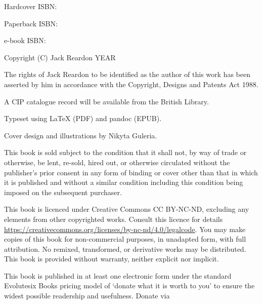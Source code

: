 Hardcover ISBN:

Paperback ISBN:

e-book ISBN:

Copyright (C) Jack Reardon YEAR

The rights of Jack Reardon to be identified as the author of this work
has been asserted by him in accordance with the Copyright, Designs and
Patents Act 1988.

A CIP catalogue record will be available from the British Library.

Typeset using LaTeX (PDF) and pandoc (EPUB).

Cover design and illustrations by Nikyta Guleria.

This book is sold subject to the condition that it shall not, by way of
trade or otherwise, be lent, re-sold, hired out, or otherwise circulated
without the publisher's prior consent in any form of binding or cover
other than that in which it is published and without a similar condition
including this condition being imposed on the subsequent purchaser.

This book is licenced under Creative Commons CC BY-NC-ND, excluding any
elements from other copyrighted works. Consult this licence for details
\url{https://creativecommons.org/licenses/by-nc-nd/4.0/legalcode}. You
may make copies of this book for non-commercial purposes, in unadapted
form, with full attribution. No remixed, transformed, or derivative
works may be distributed. This book is provided without warranty,
neither explicit nor implicit.

This book is published in at least one electronic form under the
standard Evolutesix Books pricing model of `donate what it is worth to
you' to ensure the widest possible readership and usefulness. Donate via

